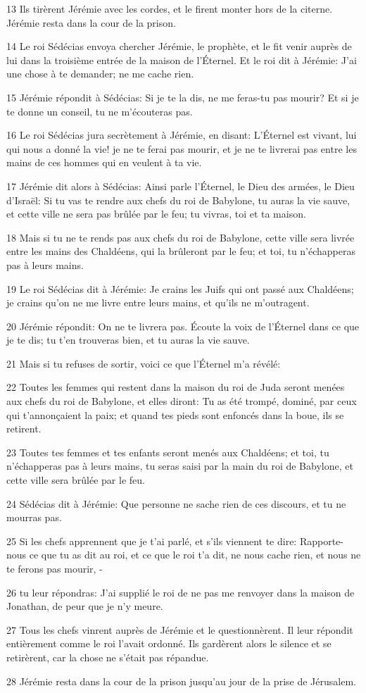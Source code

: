 \par 13 Ils tirèrent Jérémie avec les cordes, et le firent monter hors de la citerne. Jérémie resta dans la cour de la prison.
\par 14 Le roi Sédécias envoya chercher Jérémie, le prophète, et le fit venir auprès de lui dans la troisième entrée de la maison de l'Éternel. Et le roi dit à Jérémie: J'ai une chose à te demander; ne me cache rien.
\par 15 Jérémie répondit à Sédécias: Si je te la dis, ne me feras-tu pas mourir? Et si je te donne un conseil, tu ne m'écouteras pas.
\par 16 Le roi Sédécias jura secrètement à Jérémie, en disant: L'Éternel est vivant, lui qui nous a donné la vie! je ne te ferai pas mourir, et je ne te livrerai pas entre les mains de ces hommes qui en veulent à ta vie.
\par 17 Jérémie dit alors à Sédécias: Ainsi parle l'Éternel, le Dieu des armées, le Dieu d'Israël: Si tu vas te rendre aux chefs du roi de Babylone, tu auras la vie sauve, et cette ville ne sera pas brûlée par le feu; tu vivras, toi et ta maison.
\par 18 Mais si tu ne te rends pas aux chefs du roi de Babylone, cette ville sera livrée entre les mains des Chaldéens, qui la brûleront par le feu; et toi, tu n'échapperas pas à leurs mains.
\par 19 Le roi Sédécias dit à Jérémie: Je crains les Juifs qui ont passé aux Chaldéens; je crains qu'on ne me livre entre leurs mains, et qu'ils ne m'outragent.
\par 20 Jérémie répondit: On ne te livrera pas. Écoute la voix de l'Éternel dans ce que je te dis; tu t'en trouveras bien, et tu auras la vie sauve.
\par 21 Mais si tu refuses de sortir, voici ce que l'Éternel m'a révélé:
\par 22 Toutes les femmes qui restent dans la maison du roi de Juda seront menées aux chefs du roi de Babylone, et elles diront: Tu as été trompé, dominé, par ceux qui t'annonçaient la paix; et quand tes pieds sont enfoncés dans la boue, ils se retirent.
\par 23 Toutes tes femmes et tes enfants seront menés aux Chaldéens; et toi, tu n'échapperas pas à leurs mains, tu seras saisi par la main du roi de Babylone, et cette ville sera brûlée par le feu.
\par 24 Sédécias dit à Jérémie: Que personne ne sache rien de ces discours, et tu ne mourras pas.
\par 25 Si les chefs apprennent que je t'ai parlé, et s'ils viennent te dire: Rapporte-nous ce que tu as dit au roi, et ce que le roi t'a dit, ne nous cache rien, et nous ne te ferons pas mourir, -
\par 26 tu leur répondras: J'ai supplié le roi de ne pas me renvoyer dans la maison de Jonathan, de peur que je n'y meure.
\par 27 Tous les chefs vinrent auprès de Jérémie et le questionnèrent. Il leur répondit entièrement comme le roi l'avait ordonné. Ils gardèrent alors le silence et se retirèrent, car la chose ne s'était pas répandue.
\par 28 Jérémie resta dans la cour de la prison jusqu'au jour de la prise de Jérusalem.

